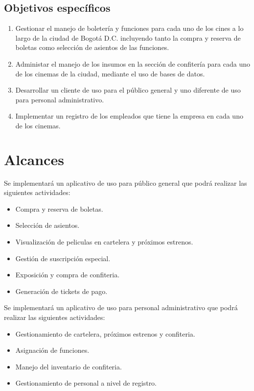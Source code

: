 \subsection{Objetivos específicos}

\begin{enumerate}
	\item Gestionar el manejo de boletería y funciones para cada uno de los cines a lo largo de la ciudad de Bogotá D.C. incluyendo tanto la compra y reserva de boletas como selección de asientos de las funciones.
	\item Administar el manejo de los insumos en la sección de confitería para cada uno de los cinemas de la ciudad, mediante el uso de bases de datos.
	\item Desarrollar un cliente de uso para el público general y uno diferente de uso para personal administrativo.
	\item Implementar un registro de los empleados que tiene la empresa en cada uno de los cinemas. 
\end{enumerate}

\section{Alcances}
Se implementará un aplicativo de uso para público general que podrá realizar las siguientes actividades:
\begin{itemize}
	\item Compra y reserva de boletas.
	\item Selección de asientos.
	\item Visualización de peliculas en cartelera y próximos estrenos.
	\item Gestión de suscripción especial.
	\item Exposición y compra de confiteria.
	\item Generación de tickets de pago.
\end{itemize}
\leavevmode
\linebreak
Se implementará un aplicativo de uso para personal administrativo que podrá realizar las siguientes actividades:
\begin{itemize}
	\item Gestionamiento de cartelera, próximos estrenos y confiteria.
	\item Asignación de funciones.
	\item Manejo del inventario de confiteria.
	\item Gestionamiento de personal a nivel de registro.
\end{itemize}


